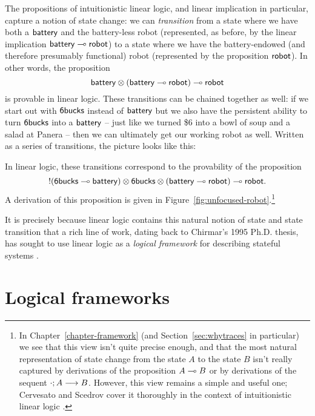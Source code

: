 The propositions of intuitionistic linear logic, and linear implication
in particular, capture a notion of state change: we can {\it
  transition} from a state where we have both a ${\sf battery}$ and
the battery-less robot (represented, as before, by the linear
implication ${\sf battery} \multimap {\sf robot}$) to a state where we
have the battery-endowed (and therefore presumably functional) robot
(represented by the proposition ${\sf robot}$). In other words, the
proposition
%
\[{\sf battery} \otimes ({\sf battery} \multimap {\sf robot}) \multimap
{\sf robot}\] 
%
is provable in linear logic. These transitions can be chained
together as well: if we start out with ${\sf
  6bucks}$ instead of ${\sf battery}$ but we also have the
persistent ability to turn ${\sf 6bucks}$ into a ${\sf battery}$ --
just like we turned \$6 into a bowl of soup and a salad at Panera --
then we can ultimately get our working robot as well.
Written as a series of transitions, the picture looks like this:

In linear logic, these transitions correspond to the provability
of the proposition
\[{!}({\sf 6bucks} \multimap {\sf battery}) \otimes {\sf 6bucks} \otimes
({\sf battery} \multimap {\sf robot}) \multimap {\sf robot}.\] A derivation
of this proposition is given in
Figure~\ref{fig:unfocused-robot}.\footnote{In
  Chapter~\ref{chapter-framework} (and Section~\ref{sec:whytraces} in
  particular) we see that this view isn't quite precise enough, and
  that the most natural representation of state change from the state
  $A$ to the state $B$ isn't really captured by derivations of the
  proposition $A \multimap B$ or by derivations of the sequent
  ${\cdot};{A} \longrightarrow {B} \mathstrut$.  However, this view remains a simple and useful
  one; Cervesato and Scedrov cover it thoroughly in the context of
  intuitionistic linear logic \cite{cervesato09relating}.}



It is precisely because linear logic contains this natural notion of
state and state transition that a rich line of work, dating back to
Chirmar's 1995 Ph.D. thesis, has sought to use linear logic as a {\it
  logical framework} for describing stateful systems
\cite{chirimar95proof,cervesato02linear,
  cervesato02concurrent,pfenning04substructural,miller09formalizing,
  pfenning09substructural,cervesato09relating}.  

\section{Logical frameworks}
\label{sec:linlogicalframeworks}

